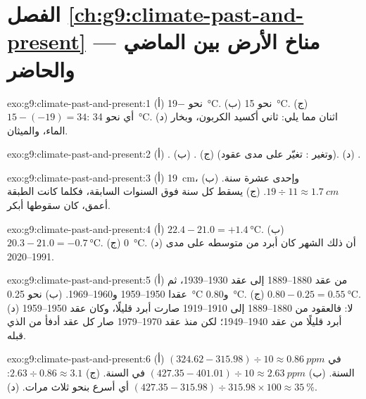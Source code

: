 \section*{الفصل \ref{ch:g9:climate-past-and-present} --- مناخ الأرض بين الماضي والحاضر}

\begin{solution}{exo:g9:climate-past-and-present:1}
(أ) نحو \qty{-19}{\degreeCelsius}. (ب) نحو \qty{15}{\degreeCelsius}.
(ج) $15 - (-19) = 34$: أي نحو \qty{34}{\degreeCelsius}. (د) اثنان مما يلي:
ثاني أكسيد الكربون، وبخار الماء، والميثان.
\end{solution}

\begin{solution}{exo:g9:climate-past-and-present:2}
(أ) . (ب) . (ج)  (وتغير : تغيّر على مدى
عقود). (د) .
\end{solution}

\begin{solution}{exo:g9:climate-past-and-present:3}
(أ) \qty{19}{cm}، وإحدى عشرة سنة. (ب) $19 \div 11 \approx \qty{1.7}{cm}$.
(ج) يسقط  كل سنة فوق  السنوات السابقة، فكلما كانت الطبقة أعمق، كان
سقوطها أبكر.
\end{solution}

\begin{solution}{exo:g9:climate-past-and-present:4}
(أ) $22.4 - 21.0 = +\qty{1.4}{\degreeCelsius}$. (ب) $20.3 - 21.0 =
\qty{-0.7}{\degreeCelsius}$. (ج) \qty{0}{\degreeCelsius}. (د) أن ذلك الشهر
كان أبرد من متوسطه على مدى 1991--2020.
\end{solution}

\begin{solution}{exo:g9:climate-past-and-present:5}
(أ) من عقد 1880--1889 إلى عقد 1930--1939، ثم عقدا 1950--1959 و1960--1969.
(ب) نحو \qty{0.25}{\degreeCelsius} و\qty{0.80}{\degreeCelsius}. (ج) $0.80 -
0.25 = \qty{0.55}{\degreeCelsius}$. (د) لا: فالعقود من 1880--1889 إلى
1910--1919 صارت أبرد قليلًا، وكان عقد 1950--1959 أبرد قليلًا من عقد
1940--1949؛ لكن منذ عقد 1970--1979 صار كل عقد أدفأ من الذي
قبله.
\end{solution}

\begin{solution}{exo:g9:climate-past-and-present:6}
(أ) $(324.62 - 315.98) \div 10 \approx \qty{0.86}{ppm}$ في السنة. (ب)
$(427.35 - 401.01) \div 10 \approx \qty{2.63}{ppm}$ في السنة. (ج) $2.63
\div 0.86 \approx 3.1$: أي أسرع بنحو ثلاث مرات. (د) $(427.35 - 315.98)
\div 315.98 \times 100 \approx 35~\%$.
\end{solution}

